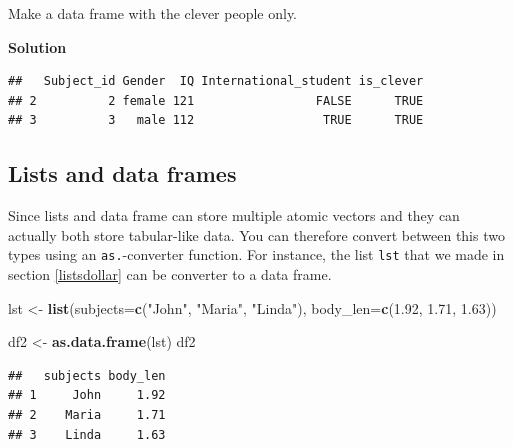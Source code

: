 \documentclass[
]{scrartcl}
\makeatletter
\newenvironment{Shaded}{\begin{snugshade}}{\end{snugshade}}
\newcommand{\AttributeTok}[1]{\textcolor[rgb]{0.13,0.29,0.53}{#1}}
\newcommand{\CommentTok}[1]{\textcolor[rgb]{0.56,0.35,0.01}{\textit{#1}}}
\newcommand{\FloatTok}[1]{\textcolor[rgb]{0.00,0.00,0.81}{#1}}
\newcommand{\FunctionTok}[1]{\textcolor[rgb]{0.13,0.29,0.53}{\textbf{#1}}}
\newcommand{\NormalTok}[1]{#1}
\newcommand{\OtherTok}[1]{\textcolor[rgb]{0.56,0.35,0.01}{#1}}
\newcommand{\SpecialCharTok}[1]{\textcolor[rgb]{0.81,0.36,0.00}{\textbf{#1}}}
\newcommand{\StringTok}[1]{\textcolor[rgb]{0.31,0.60,0.02}{#1}}
\newenvironment{kframe}{%
\medskip{}
\setlength{\fboxsep}{.8em}
 \def\at@end@of@kframe{}%
 \ifinner\ifhmode%
  \def\at@end@of@kframe{\end{minipage}}%
  \begin{minipage}{\columnwidth}%
 \fi\fi%
 \def\FrameCommand##1{\hskip\@totalleftmargin \hskip-\fboxsep
 \colorbox{shadecolor}{##1}\hskip-\fboxsep
     \hskip-\linewidth \hskip-\@totalleftmargin \hskip\columnwidth}%
 \MakeFramed {\advance\hsize-\width
   \@totalleftmargin\z@ \linewidth\hsize
   \@setminipage}}%
 {\par\unskip\endMakeFramed%
 \at@end@of@kframe}
\newenvironment{rmdblock}[1]
  {
  \begin{itemize}
  \renewcommand{\labelitemi}{
    \raisebox{-.7\height}[0pt][0pt]{
      {\setkeys{Gin}{width=3em,keepaspectratio}\texttt{[image: images/\#1]}}
    }
  }
  \setlength{\fboxsep}{1em}
  \begin{kframe}
  \item
  }
  {
  \end{kframe}
  \end{itemize}
  }
\newenvironment{myexercise}
    {\begin{rmdblock}{exercise_green}}
    {\end{rmdblock}}
\newenvironment{webexsolution}[1]
    {\par\tiny\textbf{#1}}
    {\par}
\newcommand{\webexhide}[1]{\begin{webexsolution}{#1}}
\newcommand{\webexunhide}{\end{webexsolution}}
\makeatother
\begin{document}
\begin{myexercise}
Make a data frame with the clever people only.
\end{myexercise}
\webexhide{Solution}

\begin{Shaded}
\end{Shaded}

\begin{verbatim}
##   Subject_id Gender  IQ International_student is_clever
## 2          2 female 121                 FALSE      TRUE
## 3          3   male 112                  TRUE      TRUE
\end{verbatim}

\webexunhide

\hypertarget{lists-and-data-frames}{%
\subsection{Lists and data frames}\label{lists-and-data-frames}}

Since lists and data frame can store multiple atomic vectors and they can actually both store tabular-like data. You can therefore convert between this two types using an \texttt{as.}-converter function. For instance, the list \texttt{lst} that we made in section \ref{listsdollar} can be converter to a data frame.

\begin{Shaded}
\begin{Highlighting}[]
\NormalTok{lst }\OtherTok{\textless{}{-}} \FunctionTok{list}\NormalTok{(}\AttributeTok{subjects=}\FunctionTok{c}\NormalTok{(}\StringTok{"John"}\NormalTok{, }\StringTok{"Maria"}\NormalTok{, }\StringTok{"Linda"}\NormalTok{),}
            \AttributeTok{body\_len=}\FunctionTok{c}\NormalTok{(}\FloatTok{1.92}\NormalTok{, }\FloatTok{1.71}\NormalTok{, }\FloatTok{1.63}\NormalTok{))}

\NormalTok{df2 }\OtherTok{\textless{}{-}} \FunctionTok{as.data.frame}\NormalTok{(lst)}
\NormalTok{df2}
\end{Highlighting}
\end{Shaded}

\begin{verbatim}
##   subjects body_len
## 1     John     1.92
## 2    Maria     1.71
## 3    Linda     1.63
\end{verbatim}
\end{document}
